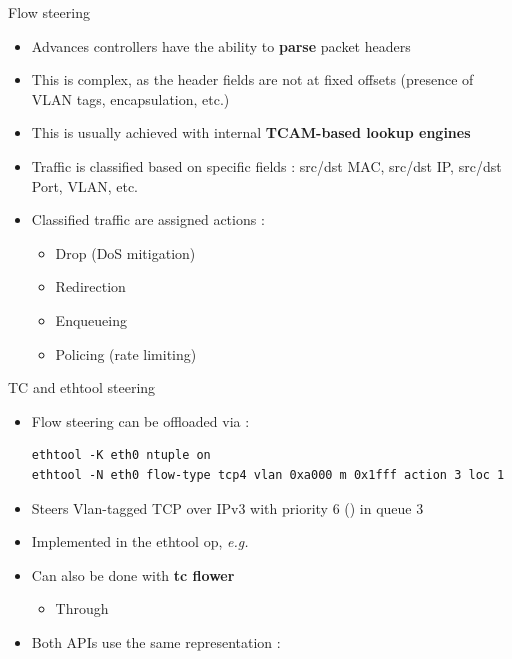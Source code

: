 \begin{frame}{Flow steering}
	\begin{itemize}
		\item Advances controllers have the ability to \textbf{parse} packet headers
		\item This is complex, as the header fields are not at fixed offsets (presence of VLAN tags, encapsulation, etc.)
		\item This is usually achieved with internal \textbf{TCAM-based lookup engines}
		\item Traffic is classified based on specific fields : src/dst MAC, src/dst IP, src/dst Port, VLAN, etc.
		\item Classified traffic are assigned actions :
			\begin{itemize}
				\item Drop (DoS mitigation)
				\item Redirection
				\item Enqueueing
				\item Policing (rate limiting)
			\end{itemize}
	\end{itemize}
\end{frame}

\begin{frame}[fragile]{TC and ethtool steering}
	\begin{itemize}
		\item Flow steering can be offloaded via  :
			\begin{verbatim}
ethtool -K eth0 ntuple on
ethtool -N eth0 flow-type tcp4 vlan 0xa000 m 0x1fff action 3 loc 1
			\end{verbatim}
		\item Steers Vlan-tagged TCP over IPv3 with priority 6 () in queue 3
		\item Implemented in the  ethtool op, \textit{e.g.} 
		\item Can also be done with \textbf{tc flower}
			\begin{itemize}
				\item Through 
			\end{itemize}
		\item Both APIs use the same representation : 
	\end{itemize}
\end{frame}


